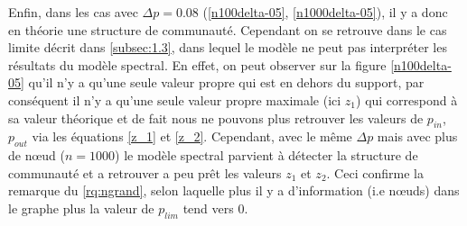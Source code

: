 Enfin, dans les cas avec $\Delta p = 0.08$ (\ref{n100delta-05}, \ref{n1000delta-05}), il y a donc en théorie une structure de communauté. 
Cependant on se retrouve dans le cas limite décrit dans \autoref{subsec:1.3}, dans lequel le modèle ne peut pas interpréter les résultats du modèle spectral.
En effet, on peut observer sur la figure \ref{n100delta-05} qu'il n'y a qu'une seule valeur propre qui est en dehors du support, par conséquent il n'y a qu'une seule valeur propre maximale (ici $z_1$) qui correspond à sa valeur théorique et de fait nous ne pouvons plus retrouver les valeurs de $p_{in}$, $p_{out}$ via les équations \eqref{z_1} et \eqref{z_2}.
Cependant, avec le même $\Delta p$ mais avec plus de nœud ($n = 1000$) le modèle spectral parvient à détecter la structure de communauté et a retrouver a peu prêt les valeurs $z_1$ et $z_2$.  
Ceci confirme la remarque du \autoref{rq:ngrand}, selon laquelle plus il y a d’information (i.e nœuds) dans le graphe plus la valeur de $p_{lim}$ tend vers $0$.

